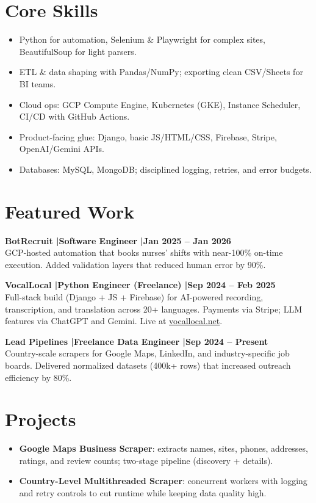 \documentclass[11pt]{article}
\begin{document}
\section*{Core Skills}
\begin{itemize}
  \item Python for automation, Selenium \& Playwright for complex sites, BeautifulSoup for light parsers.
  \item ETL \& data shaping with Pandas/NumPy; exporting clean CSV/Sheets for BI teams.
  \item Cloud ops: GCP Compute Engine, Kubernetes (GKE), Instance Scheduler, CI/CD with GitHub Actions.
  \item Product-facing glue: Django, basic JS/HTML/CSS, Firebase, Stripe, OpenAI/Gemini APIs.
  \item Databases: MySQL, MongoDB; disciplined logging, retries, and error budgets.
\end{itemize}

\section*{Featured Work}
\textbf{BotRecruit \quad|\quad Software Engineer \quad|\quad Jan 2025 -- Jan 2026}\\
GCP-hosted automation that books nurses' shifts with near-100\% on-time execution. Added validation layers that reduced human error by 90\%.

\vspace{6pt}
\textbf{VocalLocal \quad|\quad Python Engineer (Freelance) \quad|\quad Sep 2024 -- Feb 2025}\\
Full-stack build (Django + JS + Firebase) for AI-powered recording, transcription, and translation across 20+ languages. Payments via Stripe; LLM features via ChatGPT and Gemini. Live at \href{https://vocallocal.net/}{vocallocal.net}.

\vspace{6pt}
\textbf{Lead Pipelines \quad|\quad Freelance Data Engineer \quad|\quad Sep 2024 -- Present}\\
Country-scale scrapers for Google Maps, LinkedIn, and industry-specific job boards. Delivered normalized datasets (400k+ rows) that increased outreach efficiency by 80\%.

\section*{Projects}
\begin{itemize}
  \item \textbf{Google Maps Business Scraper}: extracts names, sites, phones, addresses, ratings, and review counts; two-stage pipeline (discovery + details).
  \item \textbf{Country-Level Multithreaded Scraper}: concurrent workers with logging and retry controls to cut runtime while keeping data quality high.
\end{itemize}
\end{document}
